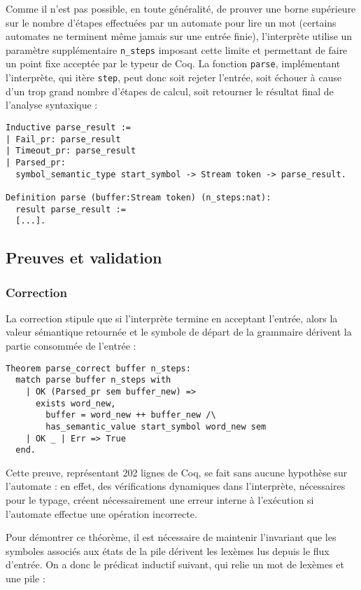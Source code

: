 \documentclass[a4paper,11pt]{article}
\begin{document}
Comme il n'est pas possible, en toute généralité, de prouver une borne
supérieure sur le nombre d'étapes effectuées par un automate pour lire
un mot (certains automates ne terminent même jamais sur une entrée
finie), l'interprète utilise un paramètre supplémentaire
\verb+n_steps+ imposant cette limite et permettant de faire un point
fixe acceptée par le typeur de Coq. La fonction \verb+parse+,
implémentant l'interprète, qui itère \verb+step+, peut donc soit
rejeter l'entrée, soit échouer à cause d'un trop grand nombre d'étapes
de calcul, soit retourner le résultat final de l'analyse syntaxique :

\begin{verbatim}
Inductive parse_result :=
| Fail_pr: parse_result
| Timeout_pr: parse_result
| Parsed_pr:
  symbol_semantic_type start_symbol -> Stream token -> parse_result.

Definition parse (buffer:Stream token) (n_steps:nat):
  result parse_result :=
  [...].
\end{verbatim}

\subsection{Preuves et validation}
\subsubsection{Correction}

La correction stipule que si l'interprète termine en acceptant
l'entrée, alors la valeur sémantique retournée et le symbole de départ
de la grammaire dérivent la partie consommée de l'entrée :

\begin{verbatim}
Theorem parse_correct buffer n_steps:
  match parse buffer n_steps with
    | OK (Parsed_pr sem buffer_new) =>
      exists word_new,
        buffer = word_new ++ buffer_new /\
        has_semantic_value start_symbol word_new sem
    | OK _ | Err => True
  end.
\end{verbatim}

Cette preuve, représentant 202 lignes de Coq, se fait sans aucune
hypothèse sur l'automate : en effet, des vérifications dynamiques
dans l'interprète, nécessaires pour le typage, créent nécessairement
une erreur interne à l'exécution si l'automate effectue une opération
incorrecte.

Pour démontrer ce théorème, il est nécessaire de maintenir l'invariant
que les symboles associés aux états de la pile dérivent les lexèmes
lus depuis le flux d'entrée. On a donc le prédicat inductif suivant,
qui relie un mot de lexèmes et une pile :
\end{document}
